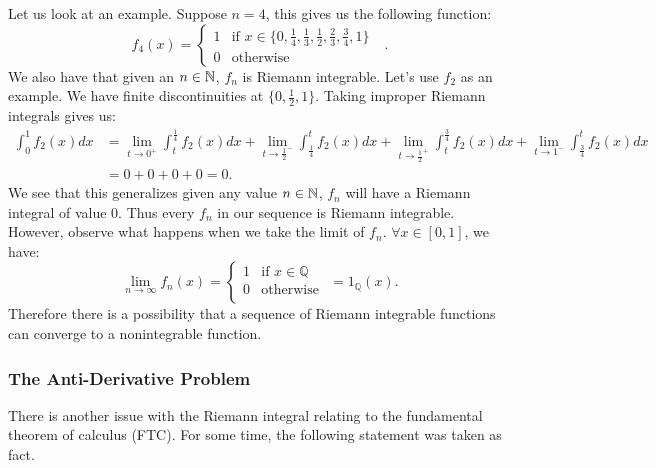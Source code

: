 \documentclass{article}
\theoremstyle{axiom} \newtheorem{axiom}{Axiom}
\theoremstyle{definition} \newtheorem{definition}{Definition}
\theoremstyle{example} \newtheorem{example}{Example}
\theoremstyle{proposition} \newtheorem{prop}{Proposition}
\theoremstyle{lemma} \newtheorem{lemma}{Lemma}
\newcommand{\Q}{\mathbb{Q}}  \newcommand{\R}{\mathbb{R}}
\begin{document}
Let us look at an example. Suppose $n=4$, this gives us the following function:
\begin{equation*}
	f_4(x) = \begin{cases}
		1 & \text{if $x \in \{0,\frac{1}{4},\frac{1}{3},\frac{1}{2},\frac{2}{3},\frac{3}{4},1\}$ }	\\
		0 & \text{otherwise }
	\end{cases}.
\end{equation*}
We also have that given an $n \in \mathbb{N}$, $f_n$ is Riemann integrable. 
Let's use $f_2$ as an example. We have finite discontinuities at 
$\{0,\frac{1}{2},1\}$. Taking improper  Riemann integrals gives us:
\begin{equation*}
	\begin{split}
	\int^{1}_{0} f_2(x)dx &= 
			\lim_{t\rightarrow 0^+} \int^{\frac{1}{4}}_{t} f_2(x) dx +
 			\lim_{t\rightarrow \frac{1}{2}^-} \int^t_{\frac{1}{4}} f_2(x) dx +
 			\lim_{t\rightarrow \frac{1}{2}^+} \int^{\frac{3}{4}}_t f_2(x) dx +
 			\lim_{t\rightarrow 1^-} \int^t_{\frac{3}{4}} f_2(x) dx \\
			&= 0 + 0 + 0 + 0 = 0.
	\end{split}
\end{equation*}
We see that this generalizes given any value $n\in \mathbb{N}$, $f_n$ will have a
Riemann integral of value $0$. Thus every $f_n$ in our sequence is Riemann
integrable. However, observe what happens when we take the limit of $f_n$.
$\forall x \in [0,1]$, we have:
\begin{equation*}
	\lim_{n\rightarrow \infty} f_n(x) = 
	\begin{cases}
		1 & \text{if $x \in \Q$} \\
		0 & \text{otherwise } \\
	\end{cases}
	= 1_{\Q}(x).
\end{equation*}
Therefore there is a possibility that a sequence of Riemann integrable 
functions can converge to a nonintegrable function.

\subsubsection{The Anti-Derivative Problem} \label{sec:antiderivativeproblem}

There is another issue with the Riemann integral relating to the fundamental
theorem of calculus (FTC). For some time, the following
statement was taken as fact.
\end{document}
